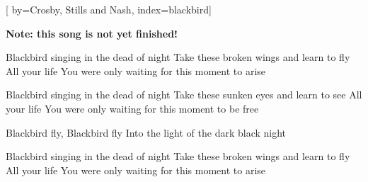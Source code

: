 
[%
    by={Crosby, Stills and Nash},
    index={blackbird}]


    \label{blackbird}

    \textbf{Note: this song is not yet finished!}

    \beginverse
        Blackbird singing in the dead of night
        Take these broken wings and learn to fly
        All your life
        You were only waiting for this moment to arise
    \endverse

    \beginverse
        Blackbird singing in the dead of night
        Take these sunken eyes and learn to see
        All your life
        You were only waiting for this moment to be free
    \endverse

    \beginchorus
        \lrep Blackbird fly, Blackbird fly
        Into the light of the dark black night \rrep {}
    \endchorus

    \beginverse
        Blackbird singing in the dead of night
        Take these broken wings and learn to fly
        All your life
        You were only waiting for this moment to arise 
    \endverse
\endsong
